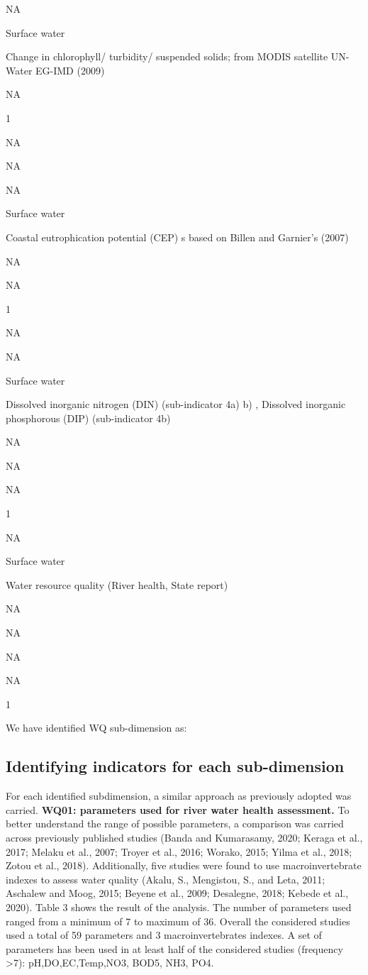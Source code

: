 \documentclass[
]{book}
\begin{document}
NA

Surface water

Change in chlorophyll/ turbidity/ suspended solids; from MODIS satellite UN-Water EG-IMD (2009)

NA

1

NA

NA

NA

Surface water

Coastal eutrophication potential (CEP) s based on Billen and Garnier's (2007)

NA

NA

1

NA

NA

Surface water

Dissolved inorganic nitrogen (DIN) (sub-indicator 4a) b) , Dissolved inorganic phosphorous (DIP) (sub-indicator 4b)

NA

NA

NA

1

NA

Surface water

Water resource quality (River health, State report)

NA

NA

NA

NA

1

We have identified WQ sub-dimension as:

\hypertarget{identifying-indicators-for-each-sub-dimension}{%
\subsection{Identifying indicators for each sub-dimension}\label{identifying-indicators-for-each-sub-dimension}}

For each identified subdimension, a similar approach as previously adopted was carried. \textbf{WQ01: parameters used for river water health assessment.} To better understand the range of possible parameters, a comparison was carried across previously published studies (Banda and Kumarasamy, 2020; Keraga et al., 2017; Melaku et al., 2007; Troyer et al., 2016; Worako, 2015; Yilma et al., 2018; Zotou et al., 2018). Additionally, five studies were found to use macroinvertebrate indexes to assess water quality (Akalu, S., Mengistou, S., and Leta, 2011; Aschalew and Moog, 2015; Beyene et al., 2009; Desalegne, 2018; Kebede et al., 2020). Table 3 shows the result of the analysis. The number of parameters used ranged from a minimum of 7 to maximum of 36. Overall the considered studies used a total of 59 parameters and 3 macroinvertebrates indexes. A set of parameters has been used in at least half of the considered studies (frequency \textgreater7): pH,DO,EC,Temp,NO3, BOD5, NH3, PO4.
\end{document}
